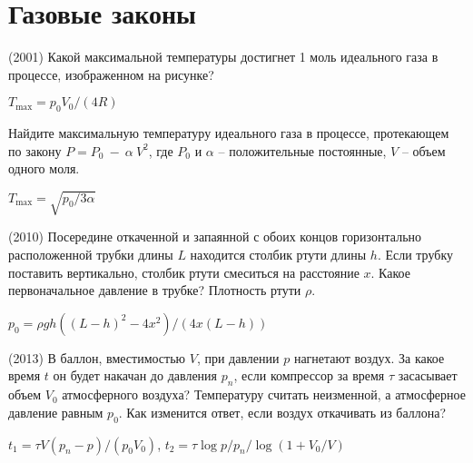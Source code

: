 \section{Газовые законы}

\begin{ex} 
(2001) Какой максимальной температуры достигнет 1 моль идеального газа в процессе, изображенном на рисунке? 
\begin{center}

\end{center}
\begin{ans}
$T_{\max}=p_0V_0/(4R)$
\end{ans}
\end{ex}

\begin{ex}
Найдите максимальную температуру идеального газа в процессе, протекающем по закону $P=P_0~-~\alpha~V^2$, где $P_0$ и $\alpha$ -- положительные постоянные, $V$ -- объем одного моля.
\begin{ans}
$T_{\max} = \sqrt{p_0/3\alpha}$
\end{ans}
\end{ex}

\begin{ex}
(2010) Посередине откаченной и запаянной с обоих концов горизонтально расположенной трубки длины $L$ находится столбик ртути длины $h$. 
Если трубку поставить вертикально, столбик ртути смеситься на расстояние $x$. Какое первоначальное давление в трубке? Плотность ртути $\rho$.
\begin{ans}
$p_0 = \rho g h \left( (L-h)^2 - 4x^2 \right)/ (4x(L-h))$
\end{ans}
\end{ex}

\begin{ex}
(2013) В баллон, вместимостью $V$, при давлении $p$ нагнетают воздух. За какое время $t$ он будет накачан до давления $p_n$, если компрессор за время $\tau$ засасывает объем $V_0$ атмосферного воздуха? 
Температуру считать неизменной, а атмосферное давление равным $p_0$. Как изменится ответ, если воздух откачивать из баллона?
\begin{ans}
$t_1 = \tau V(p_n-p)/(p_0V_0)$, $t_2 = \tau \log p/p_n /\log (1+V_0/V)$
\end{ans}
\end{ex}

